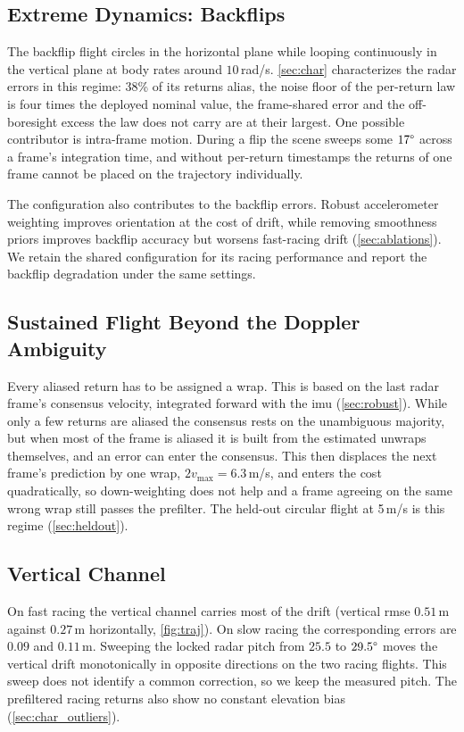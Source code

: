 \subsection{Extreme Dynamics: Backflips}
\label{sec:backflips}
The backflip flight circles in the horizontal plane while looping
continuously in the vertical plane at body rates around
$10$\,rad/s.  \autoref{sec:char} characterizes the
radar errors in this regime: 38\% of its returns alias, the noise floor of
the per-return law is four times the deployed nominal value, the
frame-shared error and the off-boresight excess the law does not carry
are at their largest.  One possible contributor is intra-frame
motion.  During a flip the scene sweeps some $17\degree$ across a
frame's integration time, and without
per-return timestamps the returns of one frame cannot be placed on the
trajectory individually.

The configuration also contributes to the backflip errors.
Robust accelerometer weighting improves orientation at the cost of
drift, while removing smoothness priors improves backflip accuracy
but worsens fast-racing drift (\autoref{sec:ablations}).  We retain
the shared configuration for its racing performance and report the
backflip degradation under the same settings.

\subsection{Sustained Flight Beyond the Doppler Ambiguity}
\label{sec:alias_limit}
Every aliased return has to be assigned a wrap. This is based on the last radar frame's consensus velocity, integrated forward with the
\ac{imu} (\autoref{sec:robust}). While only a few returns are aliased
the consensus rests on the unambiguous majority, but when most of the
frame is aliased it is built from the estimated unwraps themselves, and
an error can enter the consensus. This then displaces the next frame's
prediction by one wrap, $2v_{\max} = 6.3$\,m/s, and enters the cost
quadratically, so down-weighting does not help and a frame agreeing on
the same wrong wrap still passes the prefilter. The held-out circular
flight at 5\,m/s is this regime (\autoref{sec:heldout}).

\subsection{Vertical Channel}
\label{sec:vertical}
On fast racing the vertical channel carries most of the drift
(vertical \ac{rmse} $0.51$\,m against $0.27$\,m horizontally,
\autoref{fig:traj}).  On slow racing the corresponding errors are
$0.09$ and $0.11$\,m.  Sweeping the locked radar pitch from $25.5$ to
$29.5\degree$ moves the vertical drift monotonically in opposite
directions on the two racing flights.  This sweep does not identify
a common correction, so we keep the measured pitch.  The prefiltered
racing returns also show no constant elevation bias
(\autoref{sec:char_outliers}).

